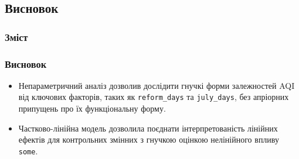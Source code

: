 \documentclass{beamer}
\begin{document}
\begin{frame}
  \section{Висновок}

  \frametitle{Зміст}
  \tableofcontents[currentsection]
\end{frame}

\begin{frame}
  \frametitle{Висновок}

  \begin{itemize}
    \item Непараметричний аналіз дозволив дослідити гнучкі форми залежностей AQI від ключових факторів, таких як \texttt{reform\_days} та \texttt{july\_days}, без апріорних припущень про їх функціональну форму.
    \item Частково-лінійна модель дозволила поєднати інтерпретованість лінійних ефектів для контрольних змінних з гнучкою оцінкою нелінійного впливу \texttt{some}.
  \end{itemize}

\end{frame}
\end{document}
